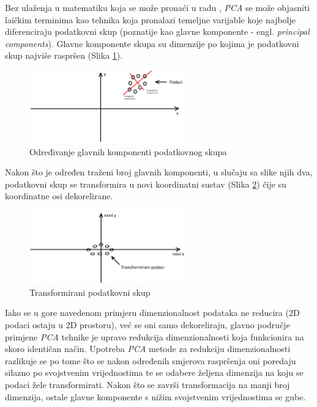 \documentclass[times, utf8, proizvoljni, numeric]{fer}
\begin{document}
Bez ulaženja u matematiku koja se može pronaći u radu \cite{PCA}, \textit{PCA} se može objasniti laičkim terminima kao tehnika koja pronalazi temeljne varijable koje najbolje diferenciraju podatkovni skup (poznatije kao glavne komponente - engl. \textit{principal components}). Glavne komponente skupa su dimenzije po kojima je podatkovni skup najviše raspršen (Slika \ref{fg:pca_start}).

\begin{figure}[!ht]
	\begin{center}
		\captionsetup{justification=centering}
		\includegraphics[width=0.6\textwidth]{./imgs/pca_start.png}
		\caption{Određivanje glavnih komponenti podatkovnog skupa}
		\label{fg:pca_start}
	\end{center}
\end{figure}

Nakon što je određen traženi broj glavnih komponenti, u slučaju sa slike njih dva, podatkovni skup se transformira u novi koordinatni sustav (Slika \ref{fg:pca_end}) čije su koordinatne osi dekorelirane.

\begin{figure}[H]
	\begin{center}
		\captionsetup{justification=centering}
		\includegraphics[width=0.6\textwidth]{./imgs/pca_end.png}
		\caption{Transformirani podatkovni skup}
		\label{fg:pca_end}
	\end{center}
\end{figure}

Iako se u gore navedenom primjeru dimenzionalnost podataka ne reducira (2D podaci ostaju u 2D prostoru), već se oni samo dekoreliraju, glavno područje primjene \textit{PCA} tehnike je upravo redukcija dimenzionalnosti koja funkcionira na skoro identičan način. Upotreba \textit{PCA} metode za redukciju dimenzionalnosti razlikuje se po tome što se nakon određenih smjerova raspršenja oni poredaju silazno po svojstvenim vrijednostima te se odabere željena dimenzija na koju se podaci žele transformirati. Nakon što se završi transformacija na manji broj dimenzija, ostale glavne komponente s nižim svojstvenim vrijednostima se gube. 
\end{document}
